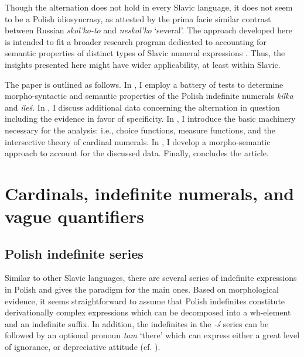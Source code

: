 \documentclass[output=paper,
]{langscibook}
\begin{document}
	\noindent Though the alternation does not hold in every Slavic language, it does not seem to be a Polish idiosyncrasy, as attested by the prima facie similar contrast between Russian \textit{skol'ko-to} and \textit{neskol'ko} `several'. The approach developed here is intended to fit a broader research program dedicated to accounting for semantic properties of distinct types of Slavic numeral expressions \citep{docekal2012atoms,docekal2013numerals,wagiel2014boys,wagiel2015sums,wagiel-toappear-entities,docekal_wagiel2018event}.  %
	Thus, the insights presented here might have wider applicability, at least within Slavic.
	
	The paper is outlined as follows. In , I employ a battery of tests to determine morpho-syntactic and semantic properties of the Polish indefinite numerals \textit{kilka} and \textit{ileś}. In , I discuss additional data concerning the alternation in question including the evidence in favor of specificity. In , I introduce the basic machinery necessary for the analysis: i.e., choice functions, measure functions, and the intersective theory of cardinal numerals. In , I develop a morpho-semantic approach to account for the discussed data. Finally,  concludes the article.
	
	\section{Cardinals, indefinite numerals, and vague quantifiers}\label{sec:cardinals-indefinite-numerals-and-vague-quantifiers}
	
	\subsection{Polish indefinite series}\label{sec:polish-indefinite-series}
	
	Similar to other Slavic languages, there are several series of indefinite expressions in Polish and  gives the paradigm for the main ones. Based on morphological evidence, it seems straightforward to assume that Polish indefinites constitute derivationally complex expressions which can be decomposed into a wh-element and an indefinite suffix. In addition, the indefinites in the \textit{-ś} series can be followed by an optional pronoun \textit{tam} `there' which can express either a great level of ignorance, or depreciative attitude (cf. \citealt{bylinina2010depreciative}).
	
\end{document}

